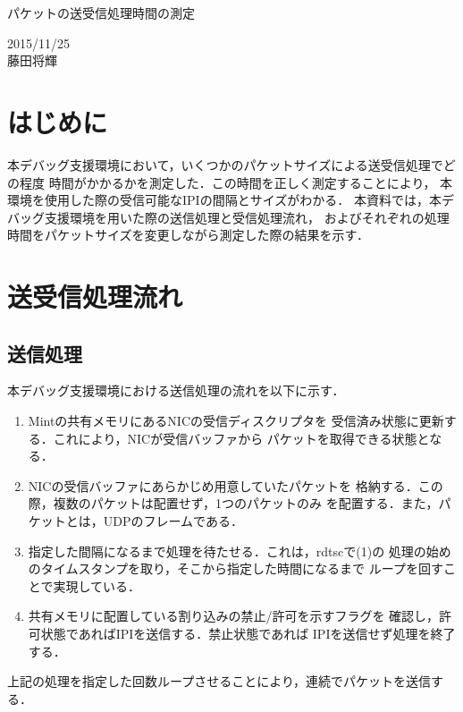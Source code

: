 \documentclass[12pt]{jsarticle}
\begin{document}

\begin{center}
    {\LARGE パケットの送受信処理時間の測定}
\end{center}

\begin{flushright}
    2015/11/25\\
    藤田将輝
\end{flushright}
\section{はじめに}
本デバッグ支援環境において，いくつかのパケットサイズによる送受信処理でどの程度
時間がかかるかを測定した．この時間を正しく測定することにより，
本環境を使用した際の受信可能なIPIの間隔とサイズがわかる．
本資料では，本デバッグ支援環境を用いた際の送信処理と受信処理流れ，
およびそれぞれの処理時間をパケットサイズを変更しながら測定した際の結果を示す．

\section{送受信処理流れ}
\subsection{送信処理}\label{tx}
本デバッグ支援環境における送信処理の流れを以下に示す．
\begin{enumerate}
    \item Mintの共有メモリにあるNICの受信ディスクリプタを
        受信済み状態に更新する．これにより，NICが受信バッファから
        パケットを取得できる状態となる．
    \item NICの受信バッファにあらかじめ用意していたパケットを
        格納する．この際，複数のパケットは配置せず，1つのパケットのみ
        を配置する．また，パケットとは，UDPのフレームである．
    \item 指定した間隔になるまで処理を待たせる．これは，rdtscで(1)の
        処理の始めのタイムスタンプを取り，そこから指定した時間になるまで
        ループを回すことで実現している．
    \item 共有メモリに配置している割り込みの禁止/許可を示すフラグを
        確認し，許可状態であればIPIを送信する．禁止状態であれば
        IPIを送信せず処理を終了する．
\end{enumerate}
上記の処理を指定した回数ループさせることにより，連続でパケットを送信する．
\end{document}
